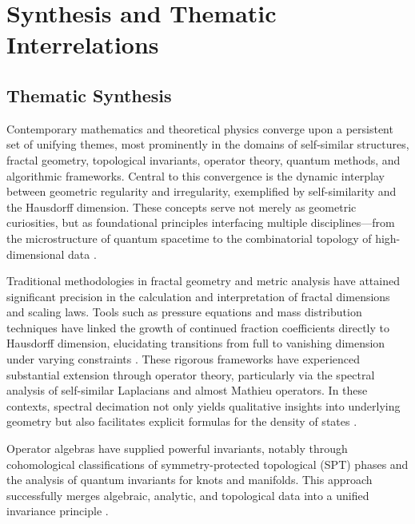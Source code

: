 \section{Synthesis and Thematic Interrelations}

\subsection{Thematic Synthesis}

Contemporary mathematics and theoretical physics converge upon a persistent set of unifying themes, most prominently in the domains of self-similar structures, fractal geometry, topological invariants, operator theory, quantum methods, and algorithmic frameworks. Central to this convergence is the dynamic interplay between geometric regularity and irregularity, exemplified by self-similarity and the Hausdorff dimension. These concepts serve not merely as geometric curiosities, but as foundational principles interfacing multiple disciplines—from the microstructure of quantum spacetime to the combinatorial topology of high-dimensional data \cite{ref5,ref7,ref8,ref10,ref11,ref19,ref20,ref22,ref24,ref25,ref26,ref30,ref35,ref36,ref37,ref38,ref39,ref40,ref51,ref54,ref55,ref56,ref57,ref58,ref59,ref60,ref61,ref62,ref63,ref64,ref65}.

Traditional methodologies in fractal geometry and metric analysis have attained significant precision in the calculation and interpretation of fractal dimensions and scaling laws. Tools such as pressure equations and mass distribution techniques have linked the growth of continued fraction coefficients directly to Hausdorff dimension, elucidating transitions from full to vanishing dimension under varying constraints \cite{ref24}. These rigorous frameworks have experienced substantial extension through operator theory, particularly via the spectral analysis of self-similar Laplacians and almost Mathieu operators. In these contexts, spectral decimation not only yields qualitative insights into underlying geometry but also facilitates explicit formulas for the density of states \cite{ref25}. 

Operator algebras have supplied powerful invariants, notably through cohomological classifications of symmetry-protected topological (SPT) phases and the analysis of quantum invariants for knots and manifolds. This approach successfully merges algebraic, analytic, and topological data into a unified invariance principle \cite{ref26,ref56}.

